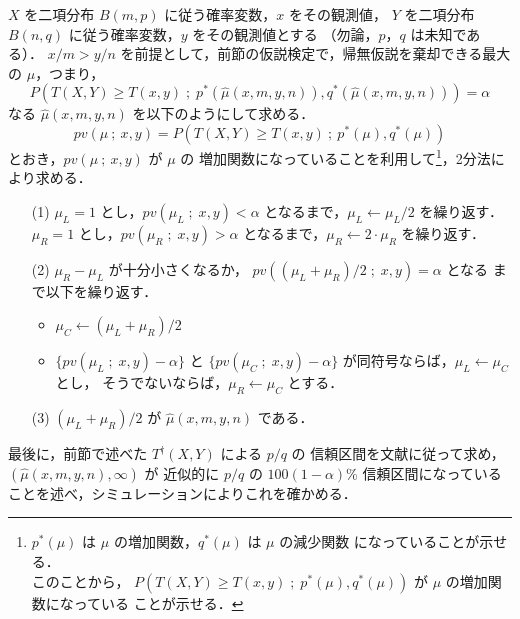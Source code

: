 \documentclass[japanese]{jnlp_1.4}
\begin{document}
$X$ を二項分布 $B(m,p)$ に従う確率変数，$x$ をその観測値，
$Y$ を二項分布 $B(n,q)$ に従う確率変数，$y$ をその観測値とする
（勿論，$p$，$q$ は未知である）．
$x/m > y/n$ を前提として，前節の仮説検定で，帰無仮説を棄却できる最大の
$\mu$，つまり，
\begin{equation}
 P(T(X,Y)\geq T(x,y)\;;\;
    p^*(\widehat{\mu}(x,m,y,n)),q^*(\widehat{\mu}(x,m,y,n))) =\alpha
\end{equation}
なる $\widehat{\mu}(x,m,y,n)$ を以下のようにして求める．
\[
 pv(\mu\:;\:x,y)=P(T(X,Y)\geq T(x,y)\:;\:p^*(\mu),q^*(\mu))
\]
とおき，$pv(\mu\:;\:x,y)$ が $\mu$ の
増加関数になっていることを利用して\footnote{
$p^*(\mu)$ は $\mu$ の増加関数，$q^*(\mu)$ は $\mu$ の減少関数
になっていることが示せる．\\このことから，
$P(T(X,Y)\geq T(x,y)\;;\; p^*(\mu),q^*(\mu))$ が $\mu$ の増加関数になっている
ことが示せる．
}，2分法により求める．

\begin{itemize}
\item[(1)] $\mu_L=1$ とし，$pv(\mu_L\;;\; x,y)<\alpha$
           となるまで，$\mu_L\leftarrow \mu_L/2$ を繰り返す．\\
           $\mu_R=1$ とし，$pv(\mu_R\;;\; x,y)>\alpha$
           となるまで，$\mu_R\leftarrow 2\cdot\mu_R$ を繰り返す．
\item[(2)] $\mu_R-\mu_L$ が十分小さくなるか，
           $pv((\mu_L+\mu_R)/2\;;\;x,y)=\alpha$ となる
           まで以下を繰り返す．
           \begin{itemize}
           \item $\mu_C\leftarrow(\mu_L+\mu_R)/2$
           \item $\{pv(\mu_L\;;\;x,y)-\alpha\}$
                 と $\{pv(\mu_C\;;\;x,y)-\alpha\}$
                 が同符号ならば，$\mu_L\leftarrow\mu_C$ とし，
		 そうでないならば，$\mu_R\leftarrow\mu_C$ とする．
           \end{itemize}
\item[(3)] $(\mu_L+\mu_R)/2$ が $\widehat{\mu}(x,m,y,n)$ である．
\end{itemize}

最後に，前節で述べた $T^\dagger(X,Y)$ による $p/q$ の
信頼区間を文献\cite{統計テキスト}に従って求め，
$(\widehat{\mu}(x,m,y,n),\infty)$ が
近似的に $p/q$ の $100(1-\alpha)\%$ 信頼区間になっている
ことを述べ，シミュレーションによりこれを確かめる．
\end{document}
